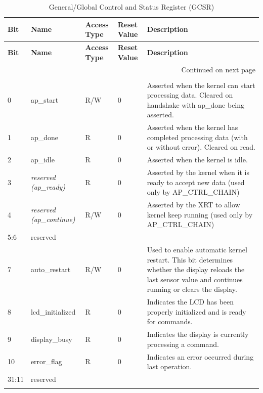     \begin{longtable}{|p{1cm}|p{3cm}|p{2cm}|p{1cm}|p{6.25cm}|}
    \hline
    \textbf{Bit} & \textbf{Name} & \textbf{Access Type} & \textbf{Reset Value} & \textbf{Description} \\
    \hline
    \endfirsthead
    \hline
    \textbf{Bit} & \textbf{Name} & \textbf{Access Type} & \textbf{Reset Value} & \textbf{Description} \\
    \hline
    \endhead
    \hline \multicolumn{5}{|r|}{{Continued on next page}} \\ \hline
    \endfoot
    \hline
    \endlastfoot
    
    \multicolumn{5}{|c|}{\textbf{0x00 GCSR - General/Global Control and Status Register}} \\
    \hline
    0 & ap\_start & R/W & 0 & Asserted when the kernel can start processing data. Cleared on handshake with ap\_done being asserted. \\
    \hline
    1 & ap\_done & R & 0 & Asserted when the kernel has completed processing data (with or without error). Cleared on read. \\
    \hline
    2 & ap\_idle & R & 0 & Asserted when the kernel is idle. \\
    \hline
    3 & \textit{reserved (ap\_ready)} & R & 0 & Asserted by the kernel when it is ready to accept new data (used only by AP\_CTRL\_CHAIN) \\
    \hline
    4 & \textit{reserved (ap\_continue)} & R/W & 0 & Asserted by the XRT to allow kernel keep running (used only by AP\_CTRL\_CHAIN) \\
    \hline
    5:6 & reserved & & & \\
    \hline
    7 & auto\_restart & R/W & 0 & Used to enable automatic kernel restart. This bit determines whether the display reloads the last sensor value and continues running or clears the display. \\
    \hline
    8 & lcd\_initialized & R & 0 & Indicates the LCD has been properly initialized and is ready for commands. \\
    \hline
    9 & display\_busy & R & 0 & Indicates the display is currently processing a command. \\
    \hline
    10 & error\_flag & R & 0 & Indicates an error occurred during last operation. \\
    \hline
    31:11 & reserved & & & \\
    \caption{General/Global Control and Status Register (GCSR)}
    \label{tab:gcsr}
    \end{longtable}
    
